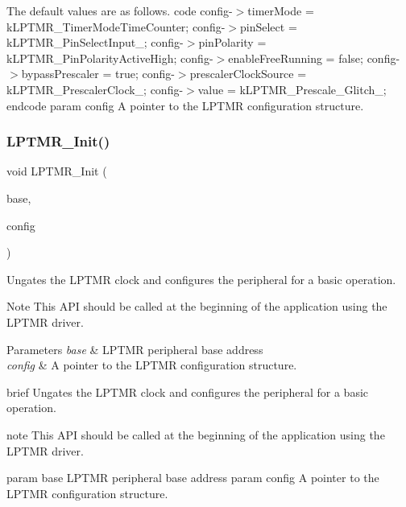 The default values are as follows. code config-\/$>$timer\+Mode = k\+L\+P\+T\+M\+R\+\_\+\+Timer\+Mode\+Time\+Counter; config-\/$>$pin\+Select = k\+L\+P\+T\+M\+R\+\_\+\+Pin\+Select\+Input\+\_; config-\/$>$pin\+Polarity = k\+L\+P\+T\+M\+R\+\_\+\+Pin\+Polarity\+Active\+High; config-\/$>$enable\+Free\+Running = false; config-\/$>$bypass\+Prescaler = true; config-\/$>$prescaler\+Clock\+Source = k\+L\+P\+T\+M\+R\+\_\+\+Prescaler\+Clock\+\_; config-\/$>$value = k\+L\+P\+T\+M\+R\+\_\+\+Prescale\+\_\+\+Glitch\+\_; endcode param config A pointer to the L\+P\+T\+MR configuration structure. \mbox{\label{group__lptmr_ga1f2e64506623dc66e329e136931b4e25}} 
\subsubsection{\texorpdfstring{LPTMR\_Init()}{LPTMR\_Init()}}
{\footnotesize\ttfamily void L\+P\+T\+M\+R\+\_\+\+Init (\begin{DoxyParamCaption}\item[{\mbox{\hyperlink{struct_l_p_t_m_r___type}{L\+P\+T\+M\+R\+\_\+\+Type}} $\ast$}]{base,  }\item[{const \mbox{\hyperlink{group__lptmr_gad0d6720b03ee0674c139c7b9bb3d0419}{lptmr\+\_\+config\+\_\+t}} $\ast$}]{config }\end{DoxyParamCaption})}



Ungates the L\+P\+T\+MR clock and configures the peripheral for a basic operation. 

\begin{DoxyNote}{Note}
This A\+PI should be called at the beginning of the application using the L\+P\+T\+MR driver.
\end{DoxyNote}

\begin{DoxyParams}{Parameters}
{\em base} & L\+P\+T\+MR peripheral base address \\
\hline
{\em config} & A pointer to the L\+P\+T\+MR configuration structure.\\
\hline
\end{DoxyParams}
brief Ungates the L\+P\+T\+MR clock and configures the peripheral for a basic operation.

note This A\+PI should be called at the beginning of the application using the L\+P\+T\+MR driver.

param base L\+P\+T\+MR peripheral base address param config A pointer to the L\+P\+T\+MR configuration structure. 